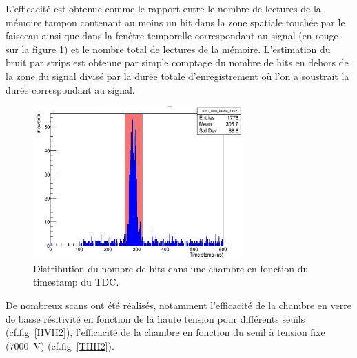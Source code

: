 L'efficacité est obtenue comme le rapport entre le nombre de lectures de la mémoire tampon contenant au moins un hit dans la zone spatiale touchée par le faisceau ainsi que dans la fenêtre temporelle correspondant au signal (en rouge sur la figure \ref{struch2}) et le nombre total de lectures de la mémoire. L'estimation du bruit par strips est obtenue par simple comptage du nombre de hits en dehors de la zone du signal divisé par la durée totale d'enregistrement où l'on a soustrait la durée correspondant au signal.

\begin{figure}[!ht]
	\centering
	\includegraphics[width=0.72\textwidth]{GLA/STRUCH2.png}
	\caption{Distribution du nombre de hits dans une chambre en fonction du timestamp du TDC.}
	\label{struch2}
\end{figure}

De nombreux scans ont été réalisés, notamment l'efficacité de la chambre en verre de basse résitivité en fonction de la haute tension pour différents seuils (cf.fig~\ref{HVH2}), l'efficacité de la chambre en fonction du seuil à tension fixe (\SI{7000}{\volt}) (cf.fig~\ref{THH2}).

